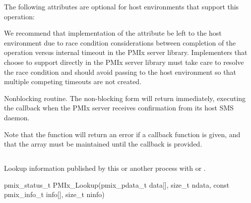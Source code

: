 \reqattrend

\optattrstart
The following attributes are optional for host environments that support this operation:


\optattrend

\adviceimplstart
We recommend that implementation of the  attribute be left to the host environment due to race condition considerations between completion of the operation versus internal timeout in the \ac{PMIx} server library. Implementers that choose to support  directly in the \ac{PMIx} server library must take care to resolve the race condition and should avoid passing  to the host environment so that multiple competing timeouts are not created.
\adviceimplend

\descr

Nonblocking  routine. The non-blocking form will return immediately, executing the callback when the \ac{PMIx} server receives confirmation from its host \ac{SMS} daemon.

Note that the function will return an error if a  callback function is given, and that the  array must be maintained until the callback is provided.


\subsection{}

\summary

Lookup information published by this or another process with  or .

\format

\cspecificstart
\begin{codepar}
pmix_status_t
PMIx_Lookup(pmix_pdata_t data[], size_t ndata,
            const pmix_info_t info[], size_t ninfo)
\end{codepar}
\cspecificend

\begin{arglist}
\end{arglist}

